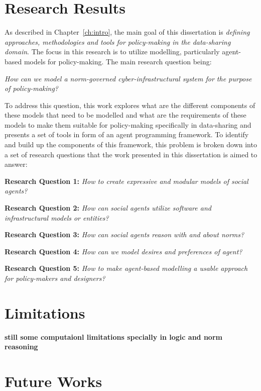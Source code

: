\section{Research Results}

As described in Chapter~\ref{ch:intro}, the main goal of this dissertation is \textit{defining approaches, methodologies and tools for policy-making in the data-sharing domain}. The focus in this research is to utilize modelling, particularly agent-based models for policy-making. The main research question being: 
\begin{displayquote}
    \textit{How can we model a norm-governed cyber-infrastructural system for the purpose of policy-making?}
\end{displayquote}

To address this question, this work explores what are the different components of these models that need to be modelled and what are the requirements of these models to make them suitable for policy-making specifically in data-sharing and presents a set of tools in form of an agent programming framework. To identify and build up the components of this framework, this problem is broken down into a set of research questions that the work presented in this dissertation is aimed to answer:

\begin{displayquote}
\textbf{Research Question 1:} \textit{How to create expressive and modular models of social agents?}
\end{displayquote}






\textbf{Research Question 2:} \textit{How can social agents utilize software and infrastructural models or entities?}

\textbf{Research Question 3:} \textit{How can social agents reason with and about norms?}

\textbf{Research Question 4:} \textit{How can we model desires and preferences of agent?}

\textbf{Research Question 5:} \textit{How to make agent-based modelling a usable approach for policy-makers and designers?}



\section{Limitations}

\textbf{still some computaionl limitations specially in logic and norm reasoning}

\textbf{}

\section{Future Works}